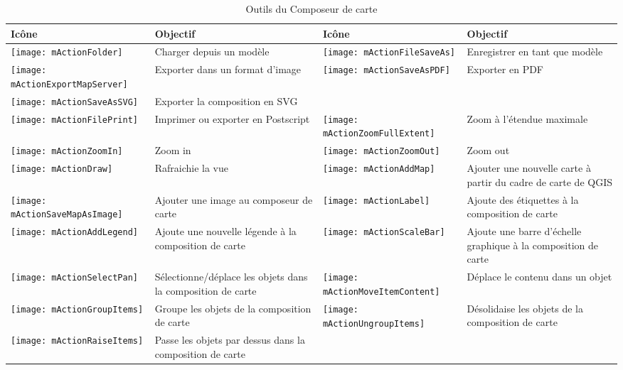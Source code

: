\begin{table}[h]
\centering
\caption{Outils du Composeur de carte}\label{tab:printcomposer_tools}\medskip
 \begin{tabular}{|l|p{6.9cm}|l|p{6.9cm}|}
 \hline \textbf{Icône} & \textbf{Objectif} & \textbf{Icône} &
 \textbf{Objectif} \\
\hline \texttt{[image: mActionFolder]} & Charger depuis un modèle &
 \texttt{[image: mActionFileSaveAs]} & Enregistrer en tant que modèle \\
\hline \texttt{[image: mActionExportMapServer]}  & Exporter dans un format d'image & 
 \texttt{[image: mActionSaveAsPDF]} & Exporter en PDF \\
\hline \texttt{[image: mActionSaveAsSVG]} & Exporter la composition en SVG \\
\hline \texttt{[image: mActionFilePrint]} & Imprimer ou exporter en Postscript &
 \texttt{[image: mActionZoomFullExtent]} & Zoom à l'étendue maximale\\
\hline \texttt{[image: mActionZoomIn]} & Zoom in &
 \texttt{[image: mActionZoomOut]} & Zoom out \\
\hline \texttt{[image: mActionDraw]} & Rafraichie la vue &
 \texttt{[image: mActionAddMap]} & Ajouter une nouvelle carte à partir du cadre de carte de QGIS \\
\hline \texttt{[image: mActionSaveMapAsImage]} & Ajouter une image au composeur de carte &
 \texttt{[image: mActionLabel]} & Ajoute des étiquettes à la composition de carte \\
\hline \texttt{[image: mActionAddLegend]} & Ajoute une nouvelle légende à la composition de carte &
 \texttt{[image: mActionScaleBar]} & Ajoute une barre d'échelle graphique à la composition de carte\\
\hline \texttt{[image: mActionSelectPan]} & Sélectionne/déplace les objets dans la composition de carte &
 \texttt{[image: mActionMoveItemContent]} & Déplace le contenu dans un objet \\
\hline \texttt{[image: mActionGroupItems]} & Groupe les objets de la composition de carte & 
 \texttt{[image: mActionUngroupItems]} & Désolidaise les objets de la composition de carte \\
\hline \texttt{[image: mActionRaiseItems]} & Passe les objets par dessus dans la composition de carte &

\end{tabular}
\end{table}
